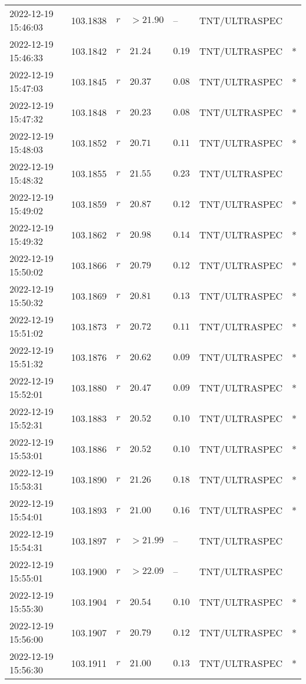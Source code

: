 \documentclass{nature_plusfigure}
\begin{document}
\begin{supplement}
\begin{center}
\begin{longtable}{lllllll}
2022-12-19 15:46:03 & 103.1838 & $r$ & $>21.90$ & -- & TNT/ULTRASPEC &  \\ 
2022-12-19 15:46:33 & 103.1842 & $r$ & $21.24$ & $0.19$ & TNT/ULTRASPEC & * \\ 
2022-12-19 15:47:03 & 103.1845 & $r$ & $20.37$ & $0.08$ & TNT/ULTRASPEC & * \\ 
2022-12-19 15:47:32 & 103.1848 & $r$ & $20.23$ & $0.08$ & TNT/ULTRASPEC & * \\ 
2022-12-19 15:48:03 & 103.1852 & $r$ & $20.71$ & $0.11$ & TNT/ULTRASPEC & * \\ 
2022-12-19 15:48:32 & 103.1855 & $r$ & $21.55$ & $0.23$ & TNT/ULTRASPEC &  \\ 
2022-12-19 15:49:02 & 103.1859 & $r$ & $20.87$ & $0.12$ & TNT/ULTRASPEC & * \\ 
2022-12-19 15:49:32 & 103.1862 & $r$ & $20.98$ & $0.14$ & TNT/ULTRASPEC & * \\ 
2022-12-19 15:50:02 & 103.1866 & $r$ & $20.79$ & $0.12$ & TNT/ULTRASPEC & * \\ 
2022-12-19 15:50:32 & 103.1869 & $r$ & $20.81$ & $0.13$ & TNT/ULTRASPEC & * \\ 
2022-12-19 15:51:02 & 103.1873 & $r$ & $20.72$ & $0.11$ & TNT/ULTRASPEC & * \\ 
2022-12-19 15:51:32 & 103.1876 & $r$ & $20.62$ & $0.09$ & TNT/ULTRASPEC & * \\ 
2022-12-19 15:52:01 & 103.1880 & $r$ & $20.47$ & $0.09$ & TNT/ULTRASPEC & * \\ 
2022-12-19 15:52:31 & 103.1883 & $r$ & $20.52$ & $0.10$ & TNT/ULTRASPEC & * \\ 
2022-12-19 15:53:01 & 103.1886 & $r$ & $20.52$ & $0.10$ & TNT/ULTRASPEC & * \\ 
2022-12-19 15:53:31 & 103.1890 & $r$ & $21.26$ & $0.18$ & TNT/ULTRASPEC & * \\ 
2022-12-19 15:54:01 & 103.1893 & $r$ & $21.00$ & $0.16$ & TNT/ULTRASPEC & * \\ 
2022-12-19 15:54:31 & 103.1897 & $r$ & $>21.99$ & -- & TNT/ULTRASPEC &  \\ 
2022-12-19 15:55:01 & 103.1900 & $r$ & $>22.09$ & -- & TNT/ULTRASPEC &  \\ 
2022-12-19 15:55:30 & 103.1904 & $r$ & $20.54$ & $0.10$ & TNT/ULTRASPEC & * \\ 
2022-12-19 15:56:00 & 103.1907 & $r$ & $20.79$ & $0.12$ & TNT/ULTRASPEC & * \\ 
2022-12-19 15:56:30 & 103.1911 & $r$ & $21.00$ & $0.13$ & TNT/ULTRASPEC & * \\ 

\end{longtable}
\end{center}
\end{supplement}
\end{document}
